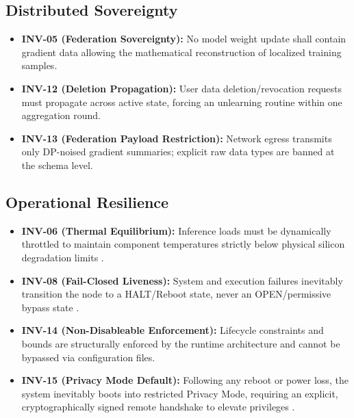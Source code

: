 \documentclass[conference]{IEEEtran}
\begin{document}
\subsection{Distributed Sovereignty}
\begin{itemize}
    \item \textbf{INV-05 (Federation Sovereignty):} No model weight update shall contain gradient data allowing the mathematical reconstruction of localized training samples.
    \item \textbf{INV-12 (Deletion Propagation):} User data deletion/revocation requests must propagate across active state, forcing an unlearning routine within one aggregation round.
    \item \textbf{INV-13 (Federation Payload Restriction):} Network egress transmits only DP-noised gradient summaries; explicit raw data types are banned at the schema level.
\end{itemize}

\subsection{Operational Resilience}
\begin{itemize}
    \item \textbf{INV-06 (Thermal Equilibrium):} Inference loads must be dynamically throttled to maintain component temperatures strictly below physical silicon degradation limits \cite{P5, P11}.
    \item \textbf{INV-08 (Fail-Closed Liveness):} System and execution failures inevitably transition the node to a HALT/Reboot state, never an OPEN/permissive bypass state \cite{P11}.
    \item \textbf{INV-14 (Non-Disableable Enforcement):} Lifecycle constraints and bounds are structurally enforced by the runtime architecture and cannot be bypassed via configuration files.
    \item \textbf{INV-15 (Privacy Mode Default):} Following any reboot or power loss, the system inevitably boots into restricted Privacy Mode, requiring an explicit, cryptographically signed remote handshake to elevate privileges \cite{P11}.
\end{itemize}

\end{document}
